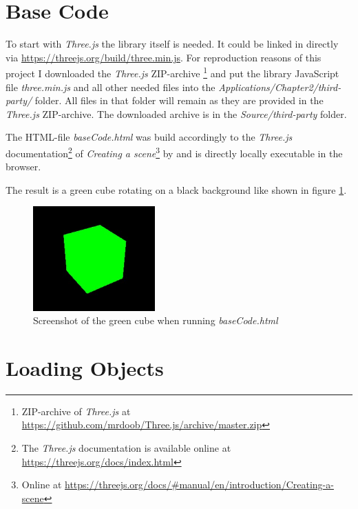 \section{Base Code}

To start with \textit{Three.js} the library itself is needed. It could be linked in directly via \url{https://threejs.org/build/three.min.js}. For reproduction reasons of this project I downloaded the \textit{Three.js} ZIP-archive \footnote{ZIP-archive of \textit{Three.js} at \url{https://github.com/mrdoob/Three.js/archive/master.zip}} and put the library JavaScript file \textit{three.min.js} and all other needed files into the \textit{Applications/Chapter2/third-party/} folder. All files in that folder will remain as they are provided in the \textit{Three.js} ZIP-archive. The downloaded archive is in the \textit{Source/third-party} folder.

The HTML-file \mbox{\textit{baseCode.html}} was build accordingly to the \textit{Three.js} documentation\footnote{The  \textit{Three.js} documentation is available online at \url{https://threejs.org/docs/index.html}} of \textit{Creating a scene}\footnote{Online at \url{https://threejs.org/docs/\#manual/en/introduction/Creating-a-scene}} by \cite{Mr.doob2018Three.js/docs/manual:Creating-a-scene.html} and is directly locally executable in the browser.

The result is a green cube rotating on a black background like shown in figure \ref{fig:green cube}.

\begin{figure}[h]
    \centering
    \includegraphics[height=4cm]{Document/Figures/chapter2/ScreenshotGreenCube.jpg}
    \caption[Screenshot of the green cube]{Screenshot of the green cube when running \textit{baseCode.html}}
    \label{fig:green cube}
\end{figure}



\section{Loading Objects}

